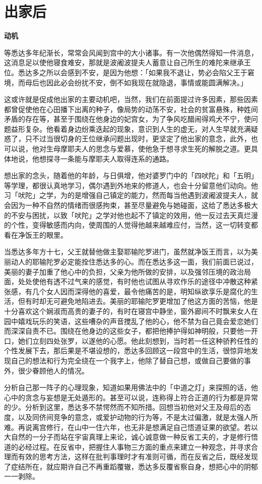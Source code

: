 \documentclass[twoside,openany]{book}
\newcommand{\mt}[1]{\textbullet \textbf{#1}}
\begin{document}
\section{出家后}\label{sec1.13}

\mt{动机}

等悉达多年纪渐长，常常会风闻到宫中的大小诸事。有一次他偶然得知一件消息，这消息足以使他寝食难安，那就是波阇波提夫人蓄意让自己所生的难陀来继承王位。悉达多之所以会感到不安，是因为他想：「如果我不退让，势必会陷父王于窘境，而母后也因此必会纷扰不安，倒不如我现在就隐退，事情或能圆满解决。」

这或许就是促成他出家的主要动机吧，当然，我们在前面提过许多因素，那些因素都曾促使他在心田播下出离的种子，像局势的动荡不安，社会的贫富悬殊，种姓间矛盾的存在等，甚至于围绕在他身边的妃宫女，为了争风吃醋闹得鸡犬不宁，使问题益形复杂。他看着身边纷乘迭起的现象，意识到人生的虚无，对人生早就充满疑惑了，只不过当很切身的王位继承问题出现时，更坚定了他出家的意念，此外，也可以说，他对生母摩耶夫人的思念与爱慕，使他急于想寻求生死的解脱之道。更具体地说，他想探寻一条能与摩耶夫人取得连系的通路。

想出家的念头，随着他的年龄，与日俱增，他对婆罗门中的「四吠陀」和「五明」等学理，都很认真地学习，偶尔遇到外地来的修道人，也会十分留意他们动向。他习「吠陀」之学，为的是增强自己镇定的能力，然而每当他遇到波阇波提夫人，就会因为一种不自然的情绪而很感拘束，甚至尽量避免与她碰面，这给了悉达多极大的不安与困扰，以致「吠陀」之学对他也起不了镇定的效用，他一反过去天真烂漫的个性，变得敏感而内向，使周围的人觉得他越来越难应付，当然，这一切转变都看在净饭王的眼里。

当悉达多年方十七，父王就替他做主娶耶输陀罗进门，虽然就净饭王而言，以为美丽动人的耶输陀罗必定能拴住悉达多的心。而在悉达多这一面，我们前面已说过，美丽的妻子加重了他心中的负担，父亲为他所做的安排，以及强邻压境的政治局面，处处使他有透不过气来的感觉，有时他也试图从寻欢作乐的途径中冲散这种紧张感，有几个女人因而深得他的喜爱，最令他痛苦的是，明知纵欲享乐是腐化的生活，但有时却无可避免地陷进去。美丽的耶输陀罗更增加了他这方面的苦恼，他是十分喜欢这个娴淑而高贵的妻子的，有时在寝宫中静坐，窗外廊间不时飘来女人在园中嬉戏玩乐的笑语，这些嘈杂的声音搅乱了他的心，他不禁为自己竟会爱恋她们而深深自责不已。围绕在他身边的这些女子，都把他捧护得如神明般，只要他一开口，她们立刻四处张罗，以遂他的心愿。他此刻想到，当时若一任这种骄矜任性的个性发展下去，那后果是不堪设想的，悉达多回顾这一段宫中的生活，很惊异地发现自己的想法和行为完全绕在一个我字上，他除了替自己想，或做自己要做的事外，很少眷顾他人的情况。

分析自己那一阵子的心理现象，知道如果用佛法中的「中道之灯」来探照的话，他心中的贪念与妄想是无处遁形的。甚至可以说，连称得上符合正道的行为都是异常的少。分析到这里，悉达多不禁愕然而不知所措。回想当初他对父王及母后的态度，以及同侪间竞争的意念，或爱护动物的行为等，不是太过偏激，就是太强人所难。再说离宫修行，在山中一住六年，也无非是想满足自己悟道证果的欲望。若以大自然的一分子而站在宇宙真理上来论，诚心诚意做一种反省工夫的，才是修行悟道的必经过程。在反省中，把握住人事物三方面的重点来建立一种观念，并寻求合理而有效的思考方法，这样在批判事理时才有准则可循，而在反省之后，既经发现了症结所在，就应期许自己不再重蹈覆辙，悉达多反覆省察自身，想把心中的阴郁一一剥除。
\end{document}
